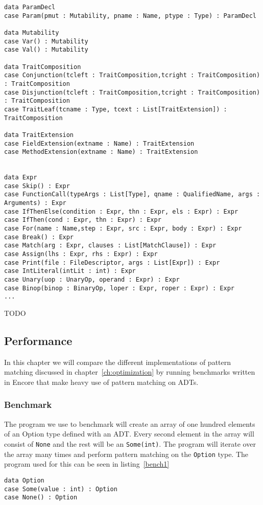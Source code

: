 \documentclass[10pt]{report}
\def\code#1{\texttt{#1}} %
\begin{document}
{\begin{lstlisting}[language=encore,caption={Abstract Syntax Tree with ADTs},label=AST]
data ParamDecl
case Param(pmut : Mutability, pname : Name, ptype : Type) : ParamDecl

data Mutability
case Var() : Mutability
case Val() : Mutability

data TraitComposition
case Conjunction(tcleft : TraitComposition,tcright : TraitComposition) : TraitComposition
case Disjunction(tcleft : TraitComposition,tcright : TraitComposition) : TraitComposition
case TraitLeaf(tcname : Type, tcext : List[TraitExtension]) : TraitComposition

data TraitExtension
case FieldExtension(extname : Name) : TraitExtension
case MethodExtension(extname : Name) : TraitExtension


data Expr
case Skip() : Expr
case FunctionCall(typeArgs : List[Type], qname : QualifiedName, args : Arguments) : Expr
case IfThenElse(condition : Expr, thn : Expr, els : Expr) : Expr
case IfThen(cond : Expr, thn : Expr) : Expr
case For(name : Name,step : Expr, src : Expr, body : Expr) : Expr
case Break() : Expr
case Match(arg : Expr, clauses : List[MatchClause]) : Expr
case Assign(lhs : Expr, rhs : Expr) : Expr
case Print(file : FileDescriptor, args : List[Expr]) : Expr
case IntLiteral(intLit : int) : Expr
case Unary(uop : UnaryOp, operand : Expr) : Expr
case Binop(binop : BinaryOp, loper : Expr, roper : Expr) : Expr
...
\end{lstlisting}
TODO
\subsection{Performance}
\par{In this chapter we will compare the different implementations of pattern matching discussed in chapter~\ref{ch:optimization} by running benchmarks written in Encore that make heavy use of pattern matching on ADTs.}
\subsubsection{Benchmark}
\par{The program we use to benchmark will create an array of one hundred elements of an Option type defined with an ADT. Every second element in the array will consist of \code{None} and the rest will be an \code{Some(int)}. The program will iterate over the array many times and perform pattern matching on the \code{Option} type. The program used for this can be seen in listing~\ref{bench1}}

\begin{lstlisting}[language=encore,caption={Program used for benchmarking},label=AST]
data Option
case Some(value : int) : Option
case None() : Option


\end{lstlisting}}
\end{document}
